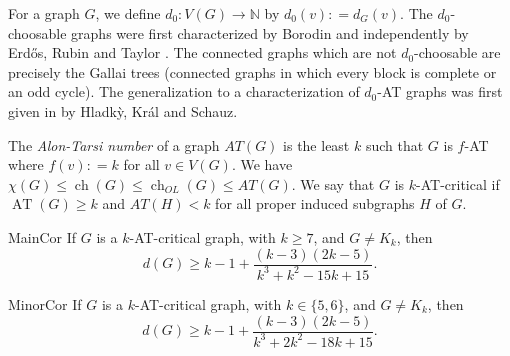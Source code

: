 \documentclass[12pt]{article}
\theoremstyle{plain}
\theoremstyle{definition}
\theoremstyle{remark}
\newcommand{\IN}{\mathbb{N}}
\newcommand{\func}[3]{#1\colon #2 \rightarrow #3}
\newcommand{\DefinedAs}{\mathrel{\mathop:}=}
\newcommand{\AT}{\operatorname{AT}}
\newcommand{\ch}{\operatorname{ch}}
\begin{document}
For a graph $G$, we define $\func{d_0}{V(G)}{\IN}$ by $d_0(v) \DefinedAs d_G(v)$.  The $d_0$-choosable graphs were first characterized by Borodin \cite{borodin1977criterion} and independently by Erd\H{o}s, Rubin and Taylor \cite{erdos1979choosability}.  The connected graphs which are not $d_0$-choosable are precisely the Gallai trees (connected graphs in which every block is complete or an odd cycle). The generalization to a characterization of $d_0$-AT graphs was first given in \cite{Hladky} by Hladk{\`y}, Kr{\'a}l and Schauz. 

The \emph{Alon-Tarsi number} of a graph $AT(G)$ is the least $k$ such that $G$ is $f$-AT where $f(v) \DefinedAs k$ for all $v \in V(G)$. We have $\chi(G) \leq \ch(G) \leq \ch_{OL}(G) \leq AT(G)$.  We say that $G$ is $k$-AT-critical if
$\AT(G) \ge k$ and $AT(H) < k$ for all proper induced subgraphs $H$ of $G$. 

\begin{repcor}{MainCor}
If $G$ is a $k$-AT-critical graph, with $k\ge 7$, and $G\ne K_k$, then
\[d(G) \ge k-1 + \frac{(k-3)(2k-5)}{k^3 + k^2 - 15k + 15}.\]
\end{repcor}


\begin{repcor}{MinorCor}
	If $G$ is a $k$-AT-critical graph, with $k\in\{5,6\}$, and $G\ne K_k$, then
	\[d(G) \ge k-1 + \frac{(k-3)(2k-5)}{k^3 + 2k^2 - 18k + 15}.\]
\end{repcor}
\end{document}

